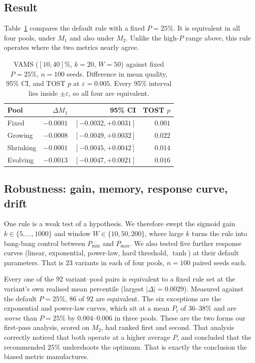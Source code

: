 \documentclass[sigconf,anonymous,review,nonacm]{acmart}
\begin{document}
\subsection{Result}
Table~\ref{tab:vams} compares the default rule with a fixed $P=25\%$. It is equivalent in
all four pools, under $M_1$ and also under $M_2$. Unlike the high-$P$ range above, this
rule operates where the two metrics nearly agree.

\begin{table}[t]\centering\small
\caption{VAMS ($[10,40]\%$, $k=20$, $W=50$) against fixed $P=25\%$, $n=100$ seeds.
Difference in mean quality, 95\% CI, and TOST $p$ at $\varepsilon=0.005$. Every 95\%
interval lies inside $\pm\varepsilon$, so all four are equivalent.}
\label{tab:vams}
\begin{tabular}{lrrr}
\toprule
Pool & $\Delta M_1$ & 95\% CI & TOST $p$\\
\midrule
Fixed     & $-0.0001$ & $[-0.0032,+0.0031]$ & $0.001$\\
Growing   & $-0.0008$ & $[-0.0049,+0.0032]$ & $0.022$\\
Shrinking & $-0.0001$ & $[-0.0045,+0.0042]$ & $0.014$\\
Evolving  & $-0.0013$ & $[-0.0047,+0.0021]$ & $0.016$\\
\bottomrule
\end{tabular}
\end{table}

\subsection{Robustness: gain, memory, response curve, drift}
One rule is a weak test of a hypothesis. We therefore swept the sigmoid gain
$k\in\{5,\dots,1000\}$ and window $W\in\{10,50,200\}$, where large $k$ turns the rule into
bang-bang control between $P_{\min}$ and $P_{\max}$. We also tested five further response
curves (linear, exponential, power-law, hard threshold, $\tanh$) at their default
parameters. That is $23$ variants in each of four pools, $n=100$ paired seeds each.

Every one of the $92$ variant--pool pairs is equivalent to a fixed rule set at the
variant's own realised mean percentile (largest $|\Delta|=0.0029$). Measured against the
default $P=25\%$, $86$ of $92$ are equivalent. The six exceptions are the exponential and
power-law curves, which sit at a mean $P_t$ of $36$--$38\%$ and are \emph{worse} than
$P=25\%$ by $0.004$--$0.006$ in three pools. These are the two forms our first-pass
analysis, scored on $M_2$, had ranked first and second. That analysis correctly noticed
that both operate at a higher average $P$, and concluded that the recommended $25\%$
undershoots the optimum. That is exactly the conclusion the biased metric manufactures.
\end{document}
